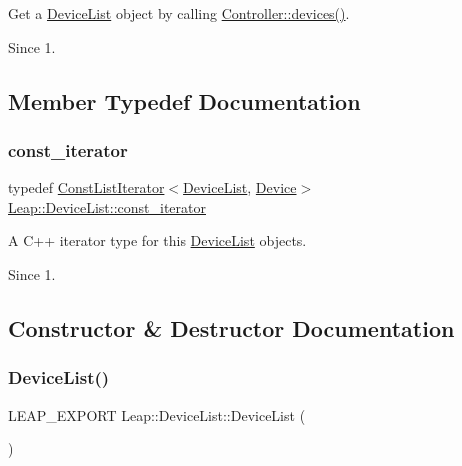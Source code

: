 Get a \hyperlink{class_leap_1_1_device_list}{Device\+List} object by calling \hyperlink{class_leap_1_1_controller_ad3b6ea558fb39cb32c20c3fd44dc5da1}{Controller\+::devices()}. \begin{DoxySince}{Since}
1. 
\end{DoxySince}


\subsection{Member Typedef Documentation}
\mbox{\label{class_leap_1_1_device_list_acfe5b07cda502759bf8fe768e8c6ba87}} 
\subsubsection{\texorpdfstring{const\+\_\+iterator}{const\_iterator}}
{\footnotesize\ttfamily typedef \hyperlink{class_leap_1_1_const_list_iterator}{Const\+List\+Iterator}$<$\hyperlink{class_leap_1_1_device_list}{Device\+List}, \hyperlink{class_leap_1_1_device}{Device}$>$ \hyperlink{class_leap_1_1_device_list_acfe5b07cda502759bf8fe768e8c6ba87}{Leap\+::\+Device\+List\+::const\+\_\+iterator}}

A C++ iterator type for this \hyperlink{class_leap_1_1_device_list}{Device\+List} objects. \begin{DoxySince}{Since}
1. 
\end{DoxySince}


\subsection{Constructor \& Destructor Documentation}
\mbox{\label{class_leap_1_1_device_list_a6b438e4f4e9486c9d38e6ac01a9e7b93}} 
\subsubsection{\texorpdfstring{Device\+List()}{DeviceList()}}
{\footnotesize\ttfamily L\+E\+A\+P\+\_\+\+E\+X\+P\+O\+RT Leap\+::\+Device\+List\+::\+Device\+List (\begin{DoxyParamCaption}{ }\end{DoxyParamCaption})}

